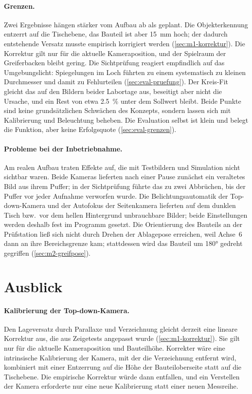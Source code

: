 \paragraph{Grenzen.} Zwei Ergebnisse hängen stärker vom Aufbau ab als geplant. Die
Objekterkennung entzerrt auf die Tischebene, das Bauteil ist aber \SI{15}{\milli\metre} hoch; der
dadurch entstehende Versatz musste empirisch korrigiert werden (\cref{sec:m1-korrektur}). Die
Korrektur gilt nur für die aktuelle Kameraposition, und der Spielraum der Greiferbacken bleibt
gering. Die Sichtprüfung reagiert empfindlich auf das Umgebungslicht: Spiegelungen im Loch führten
zu einem systematisch zu kleinen Durchmesser und damit zu Fehlurteilen
(\cref{sec:eval-pruefung}). Der Kreis-Fit gleicht das auf den Bildern beider Labortage aus,
beseitigt aber nicht die Ursache, und ein Rest von etwa \SI{2,5}{\percent} unter dem Sollwert
bleibt. Beide Punkte sind keine grundsätzlichen Schwächen des Konzepts, sondern lassen sich mit
Kalibrierung und Beleuchtung beheben. Die Evaluation selbst ist klein und
belegt die Funktion, aber keine Erfolgsquote (\cref{sec:eval-grenzen}).

\paragraph{Probleme bei der Inbetriebnahme.} Am realen Aufbau traten Effekte auf, die mit
Testbildern und Simulation nicht sichtbar waren. Beide Kameras lieferten nach einer Pause
zunächst ein veraltetes Bild aus ihrem Puffer; in der Sichtprüfung führte das zu zwei Abbrüchen,
bis der Puffer vor jeder Aufnahme verworfen wurde. Die Belichtungsautomatik der Top-down-Kamera
und der Autofokus der Seitenkamera lieferten auf dem dunklen Tisch bzw.\ vor dem hellen
Hintergrund unbrauchbare Bilder; beide Einstellungen werden deshalb fest im Programm gesetzt.
Die Orientierung des Bauteils an der Prüfstation ließ sich nicht durch Drehen der Ablagepose
erreichen, weil Achse~6 dann an ihre Bereichsgrenze kam; stattdessen wird das Bauteil um
\ang{180} gedreht gegriffen (\cref{sec:m2-greifpose}).

\section{Ausblick}
\label{sec:ausblick}

\paragraph{Kalibrierung der Top-down-Kamera.} Den Lageversatz durch Parallaxe und Verzeichnung
gleicht derzeit eine lineare Korrektur aus, die aus Zeigetests angepasst wurde
(\cref{sec:m1-korrektur}). Sie gilt nur für die aktuelle Kameraposition und Bauteilhöhe.
Korrekter wäre eine intrinsische Kalibrierung der Kamera, mit der die Verzeichnung entfernt
wird, kombiniert mit einer Entzerrung auf die Höhe der Bauteiloberseite statt auf die
Tischebene. Die empirische Korrektur würde dann entfallen, und ein Verstellen der Kamera
erforderte nur eine neue Kalibrierung statt einer neuen Messreihe.

